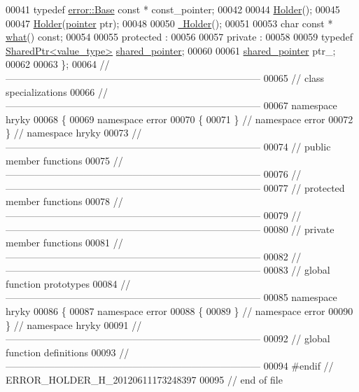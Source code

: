 \begin{DoxyCode}
00041     \textcolor{keyword}{typedef} \hyperlink{classhryky_1_1error_1_1_base}{error::Base} \textcolor{keyword}{const} * const\_pointer;
00042 
00044     \hyperlink{classhryky_1_1error_1_1_holder_a6ca38bfd85f20a356fbbb502f5014a61}{Holder}();
00045 
00047     \hyperlink{classhryky_1_1error_1_1_holder_a6ca38bfd85f20a356fbbb502f5014a61}{Holder}(\hyperlink{classhryky_1_1error_1_1_base}{pointer} ptr);
00048 
00050     \hyperlink{classhryky_1_1error_1_1_holder_af320e8f0a727858f4171c14b14e82cc0}{~Holder}();
00051 
00053     \textcolor{keywordtype}{char} \textcolor{keyword}{const} * \hyperlink{classhryky_1_1error_1_1_holder_a2b2d9a132be02b1e55fdb157ed73cb2f}{what}() \textcolor{keyword}{const};
00054 
00055 \textcolor{keyword}{protected} :
00056 
00057 \textcolor{keyword}{private} :
00058 
00059     \textcolor{keyword}{typedef} \hyperlink{classhryky_1_1_shared_ptr}{SharedPtr<value_type>} \hyperlink{classhryky_1_1_shared_ptr}{shared_pointer};
00060 
00061     \hyperlink{classhryky_1_1_shared_ptr}{shared_pointer} ptr\_;
00062 
00063 \};
00064 \textcolor{comment}{//
      ------------------------------------------------------------------------------}
00065 \textcolor{comment}{// class specializations}
00066 \textcolor{comment}{//
      ------------------------------------------------------------------------------}
00067 \textcolor{keyword}{namespace }hryky
00068 \{
00069 \textcolor{keyword}{namespace }error
00070 \{
00071 \} \textcolor{comment}{// namespace error}
00072 \} \textcolor{comment}{// namespace hryky}
00073 \textcolor{comment}{//
      ------------------------------------------------------------------------------}
00074 \textcolor{comment}{// public member functions}
00075 \textcolor{comment}{//
      ------------------------------------------------------------------------------}
00076 \textcolor{comment}{//
      ------------------------------------------------------------------------------}
00077 \textcolor{comment}{// protected member functions}
00078 \textcolor{comment}{//
      ------------------------------------------------------------------------------}
00079 \textcolor{comment}{//
      ------------------------------------------------------------------------------}
00080 \textcolor{comment}{// private member functions}
00081 \textcolor{comment}{//
      ------------------------------------------------------------------------------}
00082 \textcolor{comment}{//
      ------------------------------------------------------------------------------}
00083 \textcolor{comment}{// global function prototypes}
00084 \textcolor{comment}{//
      ------------------------------------------------------------------------------}
00085 \textcolor{keyword}{namespace }hryky
00086 \{
00087 \textcolor{keyword}{namespace }error
00088 \{
00089 \} \textcolor{comment}{// namespace error}
00090 \} \textcolor{comment}{// namespace hryky}
00091 \textcolor{comment}{//
      ------------------------------------------------------------------------------}
00092 \textcolor{comment}{// global function definitions}
00093 \textcolor{comment}{//
      ------------------------------------------------------------------------------}
00094 \textcolor{preprocessor}{#endif // ERROR\_HOLDER\_H\_20120611173248397}
00095 \textcolor{preprocessor}{}\textcolor{comment}{// end of file}
\end{DoxyCode}
